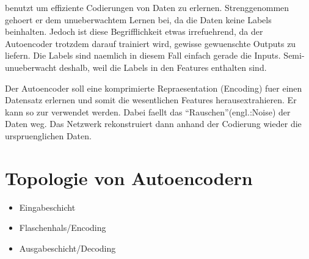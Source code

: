 benutzt um effiziente Codierungen von Daten zu erlernen. Strenggenommen gehoert
er dem unueberwachtem Lernen bei, da die Daten keine Labels beinhalten. Jedoch
ist diese Begrifflichkeit etwas irrefuehrend, da der Autoencoder trotzdem darauf
trainiert wird, gewisse gewuenschte Outputs zu liefern. Die Labels sind naemlich
in diesem Fall einfach gerade die Inputs.
Semi-unueberwacht deshalb, weil die Labels in den Features enthalten sind.

Der Autoencoder soll eine komprimierte Repraesentation (Encoding) fuer einen
Datensatz erlernen und somit die wesentlichen Features herausextrahieren. Er
kann so zur  verwendet werden. Dabei faellt
das ``Rauschen''(engl.:Noise) der Daten weg. Das Netzwerk rekonstruiert dann
anhand der Codierung wieder die urspruenglichen Daten.



\section{Topologie von Autoencodern}

\begin{itemize}
\item{Eingabeschicht}
\item{Flaschenhals/Encoding}
\item{Ausgabeschicht/Decoding}
\end{itemize}

